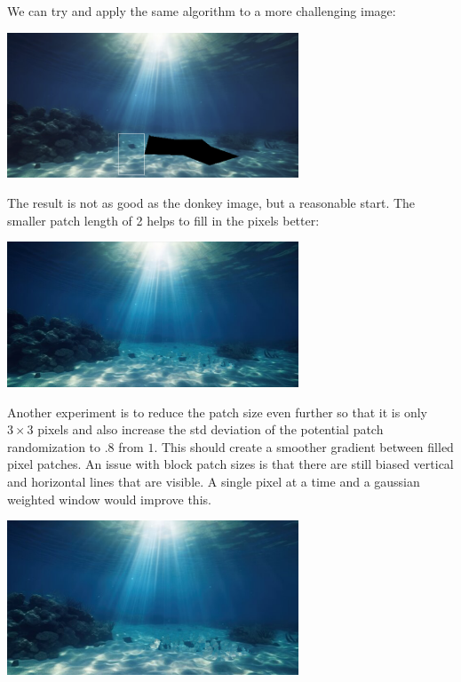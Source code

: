 \documentclass[12pt]{article}
\begin{document}
We can try and apply the same algorithm to a more challenging image:

\begin{center}
  \includegraphics[width=0.65\textwidth]{imgs/6-ocean-clip.png}
\end{center}

The result is not as good as the donkey image, but a reasonable start. The smaller patch length of 2 helps to fill in the pixels better:
\begin{center}
  \includegraphics[width=0.65\textwidth]{imgs/6-ocean-fill.png}
\end{center}

Another experiment is to reduce the patch size even further so that it is only $3 \times 3$ pixels and also increase the std deviation of the potential patch randomization to $.8$ from $1$. This should create a smoother gradient between filled pixel patches. An issue with block patch sizes is that there are still biased vertical and horizontal lines that are visible. A single pixel at a time and a gaussian weighted window would improve this.

\begin{center}
  \includegraphics[width=0.65\textwidth]{imgs/6-ocean-fill-bad.png}
\end{center}
\end{document}
